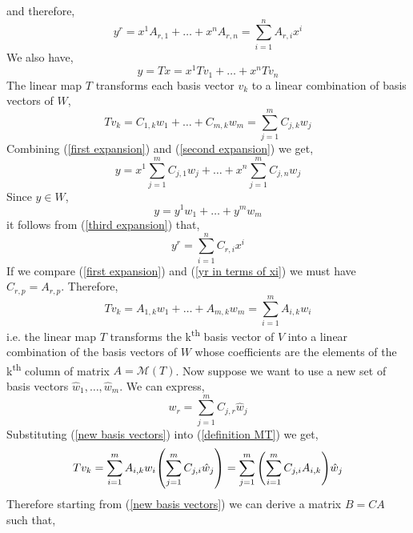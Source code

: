 \documentclass[11pt,a4paper]{scrartcl}
\theoremstyle{solve}
\begin{document}
and therefore,
\begin{equation}    
y^r = x^1 A_{r,1} + \ldots + x^n A_{r,n}  = \sum_{i=1}^n A_{r,i} x^i
\label{first expansion}
\end{equation}
We also have,
\begin{equation}
y=Tx=x^1Tv_1+\ldots+x^nTv_n \label{second expansion}
\end{equation}
The linear map $T$ transforms each basis vector $v_k$ to a linear combination of basis vectors of $W$,
\[
Tv_k = C_{1,k} w_1+\ldots+C_{m,k} w_m = \sum_{j=1}^m C_{j,k} w_j \label{basis_to_basis}
\]
Combining (\ref{first expansion}) and (\ref{second expansion}) we get,
\begin{equation}
y = x^1 \sum_{j=1}^m C_{j,1} w_j+\ldots + x^n \sum_{j=1}^m C_{j,n} w_j    
\label{third expansion}
\end{equation}
Since $y\in W$,
\begin{equation}
    y=y^1 w_1 + \ldots + y^m w_m
    \label{w expansion}
\end{equation}
it follows from (\ref{third expansion}) that,
\begin{equation}
    y^r = \sum_{i=1}^n C_{r,i}x^i
    \label{yr in terms of xi}
\end{equation}
If we compare (\ref{first expansion}) and (\ref{yr in terms of xi})
we must have $C_{r,p}=A_{r,p}$. Therefore,
\begin{equation}
Tv_k = A_{1,k} w_1+\ldots+A_{m,k} w_m  
= \sum_{i=1}^m A_{i,k} w_i
\label{definition MT}
\end{equation}
i.e. the linear map $T$ transforms the k\textsuperscript{th} basis vector of $V$ into a linear combination of
the basis vectors of $W$ whose coefficients are the elements of the k\textsuperscript{th} column of matrix $A=\mathcal{M}(T)$.
\newline\noindent Now suppose we want to use a new
set of basis vectors ${\hat w}_1,\ldots,{\hat w}_m$.
We can express,
\begin{equation}
    w_r = \sum_{j=1}^m C_{j,r} {\hat w}_j
    \label{new basis vectors}
\end{equation}
Substituting (\ref{new basis vectors}) into
(\ref{definition MT}) we get,
\begin{equation}
    Tv_k = \sum_{i=1}^m A_{i,k} w_i
    \qty(\sum_{j=1}^m C_{j,i} {\hat w}_j)
    =\sum_{j=1}^m \qty(\sum_{i=1}^m C_{j,i}A_{i,k})
    {\hat w}_j
\end{equation}
Therefore starting from (\ref{new basis vectors})
we can derive a matrix $B=CA$ such that,
\end{document}

